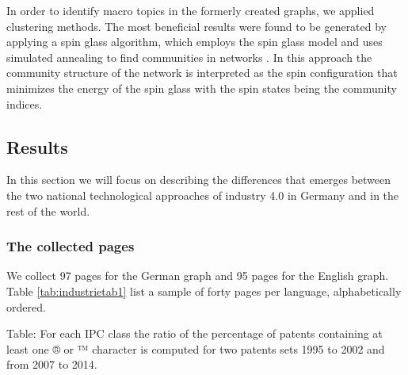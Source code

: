 \documentclass[]{book}
\begin{document}
In order to identify macro topics in the formerly created graphs, we
applied clustering methods. The most beneficial results were found to be
generated by applying a spin glass algorithm, which employs the spin
glass model and uses simulated annealing to find communities in networks
\citep{reichardt2006statistical}. In this approach the community
structure of the network is interpreted as the spin configuration that
minimizes the energy of the spin glass with the spin states being the
community indices.

\subsection{Results}\label{results-8}

In this section we will focus on describing the differences that emerges
between the two national technological approaches of industry 4.0 in
Germany and in the rest of the world.

\subsubsection*{The collected pages}\label{the-collected-pages}

We collect 97 pages for the German graph and 95 pages for the English
graph. Table \ref{tab:industrietab1} list a sample of forty pages per
language, alphabetically ordered.

Table: \label{tab:industrietab1} For each IPC class the ratio of the
percentage of patents containing at least one ® or ™ character is
computed for two patents sets 1995 to 2002 and from 2007 to 2014.
\end{document}
